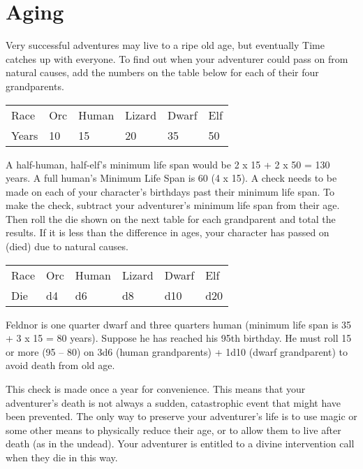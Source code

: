\section{Aging}

Very successful adventures may live to a ripe old age, but eventually Time catches up with everyone. To find out when your adventurer could pass on from natural causes, add the numbers on the table below for each of their four grandparents.

\begin{normboxc}
\small
\begin{tabular}{@{}l| l l l l l}
Race & Orc & Human & Lizard & Dwarf & Elf\\
Years & 10 & 15 & 20 & 35 & 50\\
\end{tabular}
\end{normboxc}

A half-human, half-elf's minimum life span would be 2 x 15 + 2 x 50 = 130 years. A full human's Minimum Life Span is 60 (4 x 15). A check needs to be made on each of your character's birthdays past their minimum life span. To make the check, subtract your adventurer's minimum life span from their age. Then roll the die shown on the next table for each grandparent and total the results. If it is less than the difference in ages, your character has passed on (died) due to natural causes.\\
\begin{normboxc}
\small
\begin{tabular}{@{}l| l l l l l}
Race & Orc & Human & Lizard & Dwarf & Elf\\
Die & d4 & d6 & d8 & d10 & d20\\
\end{tabular}
\end{normboxc}

Feldnor is one quarter dwarf and three quarters human (minimum life span is 35 + 3 x 15 = 80 years). Suppose he has reached his 95th birthday. He must roll 15 or more (95 – 80) on 3d6 (human grandparents) + 1d10 (dwarf grandparent) to avoid death from old age.

This check is made once a year for convenience. This means that your adventurer's death is not always a sudden, catastrophic event that might have been prevented. The only way to preserve your adventurer's life is to use magic or some other means to physically reduce their age, or to allow them to live after death (as in the undead). Your adventurer is entitled to a divine intervention call when they die in this way.
